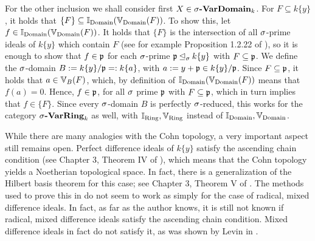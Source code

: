 \begin{prop}
\begin{bew}
For the other inclusion we shall consider first $X \in \sigma\text{{\normalfont\textbf{-VarDomain}}}_k$.
For $F \subseteq k\{y\}$, it holds that $\{F\} \subseteq \mathbb{I}_{\operatorname{Domain}}(\mathbb{V}_{\operatorname{Domain}}(F))$. To show this, let $f \in \mathbb{I}_{\operatorname{Domain}}(\mathbb{V}_{\operatorname{Domain}}(F))$.
It holds that $\{F\}$ is the intersection of all $\sigma$-prime ideals of $k\{y\}$ which contain $F$ (see for example Proposition 1.2.22 of \cite{wibmer}), so it is enough to show that $f \in \mathfrak{p}$ for each $\sigma$-prime $\mathfrak{p} \unlhd_{\sigma} k\{y\}$ with $F \subseteq \mathfrak{p}$.
We define the $\sigma$-domain $B:= k\{y\}/\mathfrak{p} =: k\{a\}$, with $a := y + \mathfrak{p} \in k\{y\}/\mathfrak{p}$. Since $F \subseteq \mathfrak{p}$, it holds that $a \in \mathbb{V}_B(F)$, which, by definition of $\mathbb{I}_{\operatorname{Domain}}(\mathbb{V}_{\operatorname{Domain}}(F))$ means that $f(a) = 0$. Hence, $f \in \mathfrak{p}$, for all $\sigma$ prime $\mathfrak{p}$
with $F \subseteq \mathfrak{p}$, which in turn implies that $f \in \{F\}$. Since every $\sigma$-domain $B$ is perfectly $\sigma$-reduced, this works for the category $\sigma\text{{\normalfont\textbf{-VarRing}}}_k$ as well, with $\mathbb{I}_{\operatorname{Ring}}, \mathbb{V}_{\operatorname{Ring}}$ instead of $\mathbb{I}_{\operatorname{Domain}}, \mathbb{V}_{\operatorname{Domain}}$.
\end{bew}

\end{prop}

While there are many analogies with the Cohn topology, a very important aspect still remains open. Perfect difference ideals of $k\{y\}$ satisfy the ascending chain condition (see Chapter 3, Theorem IV of \cite{cohn}), which means that the Cohn topology yields a Noetherian topological space.
In fact, there is a generalization of the Hilbert basis theorem for this case; see Chapter 3, Theorem V of \cite{cohn}. The methods used to prove this in \cite{cohn} do not seem to work as simply for the case of radical, mixed difference ideals.
In fact, as far as the author knows, it is still not known if radical, mixed difference ideals satisfy the ascending chain condition. Mixed difference ideals in fact do not satisfy it, as was shown by Levin in \cite{levinmixed}.





